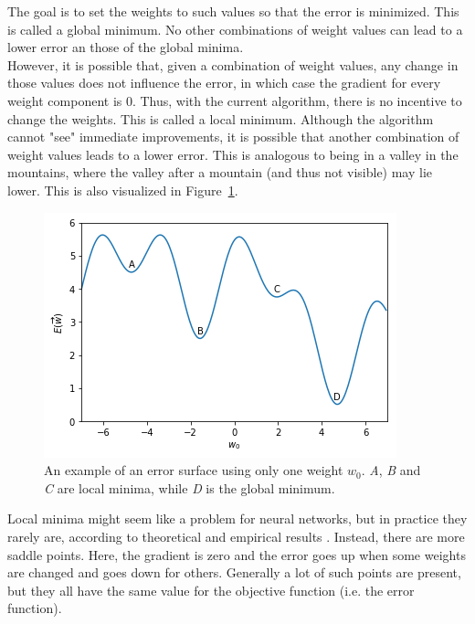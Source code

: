 The goal is to set the weights to such values so that the error is minimized. This is called a global minimum. No other combinations of weight values can lead to a lower error an those of the global minima. \\
However, it is possible that, given a combination of weight values, any change in those values does not influence the error, in which case the gradient for every weight component is $0$. Thus, with the current algorithm, there is no incentive to change the weights. This is called a local minimum. Although the algorithm cannot "see" immediate improvements, it is possible that another combination of weight values leads to a lower error. This is analogous to being in a valley in the mountains, where the valley after a mountain (and thus not visible) may lie lower. This is also visualized in Figure~\ref{fig:error_surface}.\\
\begin{figure}[htb]
    \centering
    \includegraphics[width=\linewidth]{images/error_surface.png}
    \caption[An example of an error surface]{An example of an error surface using only one weight $w_0$. \textit{A}, \textit{B} and \textit{C} are local minima, while \textit{D} is the global minimum.}
    \label{fig:error_surface}
\end{figure}
Local minima might seem like a problem for neural networks, but in practice they rarely are, according to theoretical and empirical results \citep{choromanska2015loss}.
Instead, there are more saddle points. Here, the gradient is zero and the error goes up when some weights are changed and goes down for others. Generally a lot of such points are present, but they all have the same value for the objective function (i.e. the error function).\\

